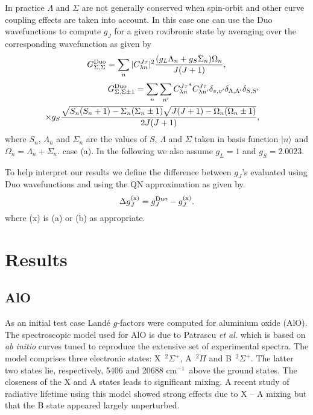 \documentclass[preprint,review,12pt]{elsarticle}
\newcommand{\red}[1]{{\color{red} #1}}
\newcommand{\2}{$_{2}$}
\newcommand{\3}{$_{3}$}
\newcommand{\4}{$_{4}$}
\newcommand{\8}{$^{18}$}
\newcommand{\6}{$^{16}$}
\newcommand{\7}{$^{17}$}
\newcommand{\cm}{cm$^{-1}$}
\newcommand{\ket}[1]{\vert #1 \rangle  }
\begin{document}
In practice $\Lambda$ and $\Sigma$ are not generally conserved when spin-orbit and other
curve coupling effects are taken into account. In this case one can
use the {\sc Duo} wavefunctions to compute $g_J$ for a given rovibronic
state by averaging over the corresponding wavefunction as given by
\begin{equation}
\label{equation:lande_hunds_diag}
G_{\Sigma,\Sigma}^{\rm Duo} = \sum_n  |C_{\lambda n}^{J\tau}|^2 \frac{(g_L\Lambda_n+g_S\Sigma_n)\Omega_n }{J(J+1)},
\end{equation}
\begin{eqnarray}
\label{equation:lande_hunds_offdg}
\nonumber
  G_{\Sigma,\Sigma\pm 1}^{\rm Duo} =\sum_n \sum_{n'} {C_{\lambda n}^{J\tau}}^{*} C_{\lambda n'}^{J\tau}
  \delta_{v,v'} \delta_{\Lambda,\Lambda'} \delta_{S,S'} && \\
\times g_S \frac{\sqrt{S_n(S_n+1) - \Sigma_n (\Sigma_n\pm 1)} \sqrt{J(J+1) - \Omega_n (\Omega_n\pm 1)}  }{2 J(J+1)}
,
\end{eqnarray}
where $S_n$, $\Lambda_n$ and $\Sigma_n$ are the values of $S$, $\Lambda$ and $\Sigma$
taken in basis function $\ket{n}$ and  $\Omega_n = \Lambda_n + \Sigma_n$.
case (a).
In the following we also assume  $g_L=1$ and $g_S=2.0023$.

To help interpret our results we
define the difference between $g_J$'s evaluated using
{\sc Duo} wavefunctions and using the QN approximation as given by.
\begin{equation}\label{e:Lande-diff}
 \Delta g_J^{\rm (x)} =  g_J^{\rm Duo} - g_J^{\rm (x)}.
\end{equation}
where (x) is (a) or (b) as appropriate.

\section{Results}

\subsection{AlO}

As an initial test case Land\'e $g$-factors were computed for aluminium
oxide (AlO). The spectroscopic model used for AlO is due to Patrascu
{\it et al.} \cite{jt598,jt589} which is based on {\it ab initio}
curves tuned to reproduce the extensive set of experimental spectra.
The model comprises three electronic states: X~$^2\Sigma^+$,
A~$^2\Pi$ and  B~$^2\Sigma^+$. The latter two states lie, respectively,
5406 and 20688 \cm\
above the ground states. The closeness of the X and A states leads to
significant mixing. A recent study of radiative lifetime \cite{jt624}
using this model showed strong effects due to X -- A mixing but that the
B state appeared largely unperturbed.
\end{document}

